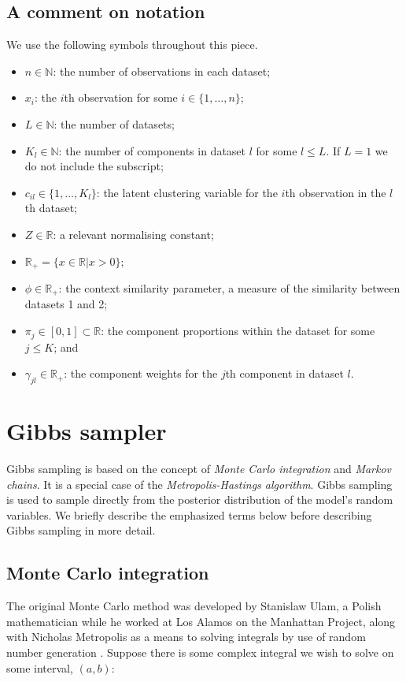 \documentclass[11pt]{article} %
\begin{document}
\subsection*{A comment on notation}
We use the following symbols throughout this piece.
\begin{itemize}
 \item $n \in \mathbb{N}$: the number of observations in each dataset;
 \item $x_i$: the $i$th observation for some $i \in \{1,\ldots, n\}$;
 \item $L  \in \mathbb{N}$: the number of datasets;
 \item $K_l \in \mathbb{N}$: the number of components in dataset $l$ for some $l \leq L$. If $L = 1$ we do not include the subscript;
 \item $c_{il} \in \{1,\ldots,K_l\}$: the latent clustering variable for the $i$th observation in the $l$th dataset;
 \item $Z \in \mathbb{R}$: a relevant normalising constant;
 \item $\mathbb{R}_+ = \{x \in \mathbb{R} | x > 0\};$
 \item $\phi \in \mathbb{R}_+$: the context similarity parameter, a measure of the similarity between datasets 1 and 2;
 \item $\pi_j \in [0, 1] \subset \mathbb{R}$: the component proportions within the dataset for some $j \leq K$; and
 \item $\gamma_{jl} \in \mathbb{R}_+$: the component weights for the $j$th component in dataset $l$.
\end{itemize}

\section{Gibbs sampler}
Gibbs sampling is based on the concept of \emph{Monte Carlo integration} and \emph{Markov chains}. It is a special case of the \emph{Metropolis-Hastings algorithm}. Gibbs sampling is used to sample directly from the posterior distribution of the model's random variables. We briefly describe the emphasized terms below before describing Gibbs sampling in more detail.

\subsection{Monte Carlo integration}
The original Monte Carlo method was developed by Stanislaw Ulam, a Polish mathematician while he worked at Los Alamos on the Manhattan Project, along with Nicholas Metropolis \cite{CooperCardinalsChaosReflection1989} as a means to solving integrals by use of random number generation \cite{MetropolisMonteCarloMethod1949}. Suppose there is some complex integral we wish to solve on some interval, $(a,b)$:
\end{document}
